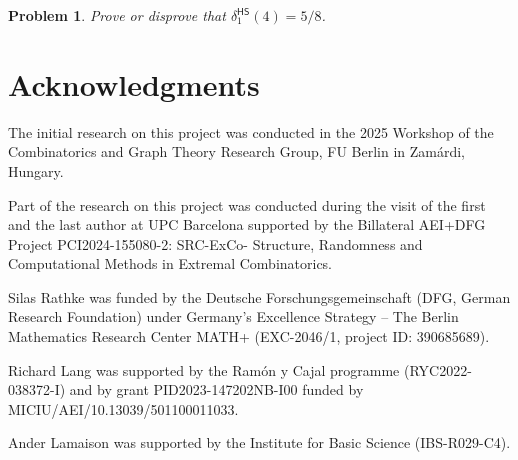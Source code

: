 \documentclass[12pt,reqno]{amsart}
\theoremstyle{plain}
\newtheorem{problem}[theorem]{Problem}
\theoremstyle{definition}
\numberwithin{equation}{section}
\DeclareMathOperator{\hs}{\mathsf{HS}}
\begin{document}
	\begin{problem}
		Prove or disprove that $\delta_1^{\hs}(4) = 5/8$.
	\end{problem}
	
	





    
	\section*{Acknowledgments}
	
	The initial research on this project was conducted in the 2025 Workshop of the Combinatorics and Graph Theory Research Group, FU Berlin in Zamárdi, Hungary.
	
	\medskip 
	Part of the research on this project was conducted during the visit of the first and the last author at UPC Barcelona supported by the Billateral AEI+DFG Project PCI2024-155080-2: SRC-ExCo- Structure, Randomness and Computational Methods in Extremal Combinatorics.
	
	\medskip
	Silas Rathke was funded by the Deutsche Forschungsgemeinschaft (DFG, German Research Foundation) under Germany's Excellence Strategy – The Berlin Mathematics Research Center MATH+ (EXC-2046/1, project ID: 390685689).
	
	\medskip
	Richard Lang was supported by the Ramón y Cajal programme (RYC2022-038372-I) and by grant PID2023-147202NB-I00 funded
	by MICIU/AEI/10.13039/501100011033.

    \medskip Ander Lamaison was supported by the Institute for Basic Science (IBS-R029-C4).
	
	





    
	
	
	
\end{document}
